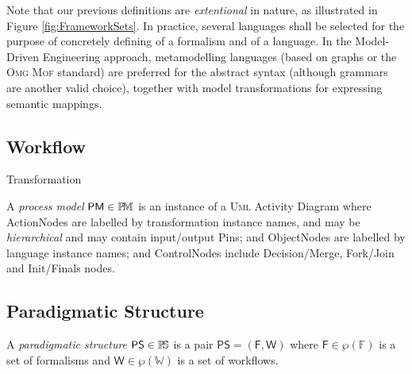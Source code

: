 Note that our previous definitions are \emph{extentional} in nature, as 
illustrated in Figure \ref{fig:FrameworkSets}. In practice, several languages 
shall be selected for the purpose of concretely defining of a formalism and 
of a language. In the Model-Driven Engineering approach, metamodelling
languages (based on graphs or the \textsc{Omg Mof} standard) are preferred for 
the abstract syntax (although grammars are another valid choice), together 
with model transformations for expressing semantic mappings.  



\subsection{Workflow}
\label{sec:Workflow}


\begin{Definition}{Transformation}
   
\end{Definition}



\begin{Definition}
   A \emph{process model} $\mathsf{PM}\in\mathbb{P}\!\mathbb{M}$ is an instance of a 
\textsc{Uml} Activity Diagram where \textsf{ActionNode}s are labelled by 
transformation instance names, and may be \emph{hierarchical} and may contain 
input/output \textsf{Pins}; and \textsf{ObjectNode}s are labelled by language 
instance names; and \textsf{ControlNode}s include 
\textsf{Decision}/\textsf{Merge}, \textsf{Fork}/\textsf{Join} and 
\textsf{Init}/\textsf{Finals} nodes.
\end{Definition}



\subsection{Paradigmatic Structure}
\label{sec:PS}

\begin{Definition}
   A \emph{paradigmatic structure} $\mathsf{PS}\in \mathbb{P}\!\mathbb{S}$ is a pair $\mathsf{PS} 
= (\mathsf{F}, \mathsf{W})$ where $\mathsf{F}\in \wp(\mathbb{F})$ is a set of 
formalisms and $\mathsf{W}\in\wp(\mathbb{W})$ is a set of workflows.
\end{Definition}

